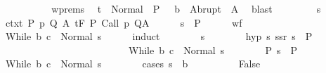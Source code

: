 \begin{isabellebody}
\isanewline
\ \ \ \ \isamarkupfalse%
\isanewline
\ \ \ \ \isamarkupfalse%
\ wprems\ \isamarkupfalse%
\ {\isachardoublequoteopen}t\ {\isasymin}\ Normal\ {\isacharbackquote}\ {\isacharparenleft}P\ {\isasyminter}\ {\isacharminus}\ b{\isacharparenright}\ {\isasymunion}\ Abrupt\ {\isacharbackquote}\ A{\isachardoublequoteclose}\ \isamarkupfalse%
\ blast\isanewline
\ \ \isamarkupfalse%
\isanewline
\ \ \ \ \isamarkupfalse%
\ s\isanewline
\ \ \ \ \isamarkupfalse%
\ ctxt{\isacharcolon}\ {\isachardoublequoteopen}{\isasymforall}{\isacharparenleft}P{\isacharcomma}\ p{\isacharcomma}\ Q{\isacharcomma}\ A{\isacharparenright}{\isasymin}{\isasymTheta}{\isachardot}\ {\isasymGamma}{\isasymTurnstile}\isactrlsub t\isactrlbsub {\isacharslash}F\isactrlesub \ P\ {\isacharparenleft}Call\ p{\isacharparenright}\ Q{\isacharcomma}A{\isachardoublequoteclose}\isanewline
\ \ \ \ \isamarkupfalse%
\ {\isachardoublequoteopen}s\ {\isasymin}\ P{\isachardoublequoteclose}\isanewline
\ \ \ \ \isamarkupfalse%
\ wf\ \isanewline
\ \ \ \ \isamarkupfalse%
\ {\isachardoublequoteopen}{\isasymGamma}{\isasymturnstile}While\ b\ c\ {\isasymdown}\ Normal\ s{\isachardoublequoteclose}\isanewline
\ \ \ \ \isamarkupfalse%
\ {\isacharparenleft}induct{\isacharparenright}\isanewline
\ \ \ \ \ \ \isamarkupfalse%
\ s\isanewline
\ \ \ \ \ \ \isamarkupfalse%
\ hyp{\isacharcolon}\ {\isachardoublequoteopen}{\isasymAnd}s{\isacharprime}{\isachardot}\ {\isasymlbrakk}{\isacharparenleft}s{\isacharprime}{\isacharcomma}s{\isacharparenright}{\isasymin}r{\isacharsemicolon}\ s{\isacharprime}\ {\isasymin}\ P{\isasymrbrakk}\ \isanewline
\ \ \ \ \ \ \ \ \ \ \ \ \ \ \ \ \ \ \ \ \ \ \ \ \ {\isasymLongrightarrow}\ {\isasymGamma}{\isasymturnstile}While\ b\ c\ {\isasymdown}\ Normal\ s{\isacharprime}{\isachardoublequoteclose}\isanewline
\ \ \ \ \ \ \isamarkupfalse%
\ P{\isacharcolon}\ {\isachardoublequoteopen}s\ {\isasymin}\ P{\isachardoublequoteclose}\isanewline
\ \ \ \ \ \ \isamarkupfalse%
\ {\isachardoublequoteopen}{\isasymGamma}{\isasymturnstile}While\ b\ c\ {\isasymdown}\ Normal\ s{\isachardoublequoteclose}\isanewline
\ \ \ \ \ \ \isamarkupfalse%
\ {\isacharparenleft}cases\ {\isachardoublequoteopen}s\ {\isasymin}\ b{\isachardoublequoteclose}{\isacharparenright}\isanewline
\ \ \ \ \ \ \ \ \isamarkupfalse%
\ False\ \isamarkupfalse%

\end{isabellebody}
